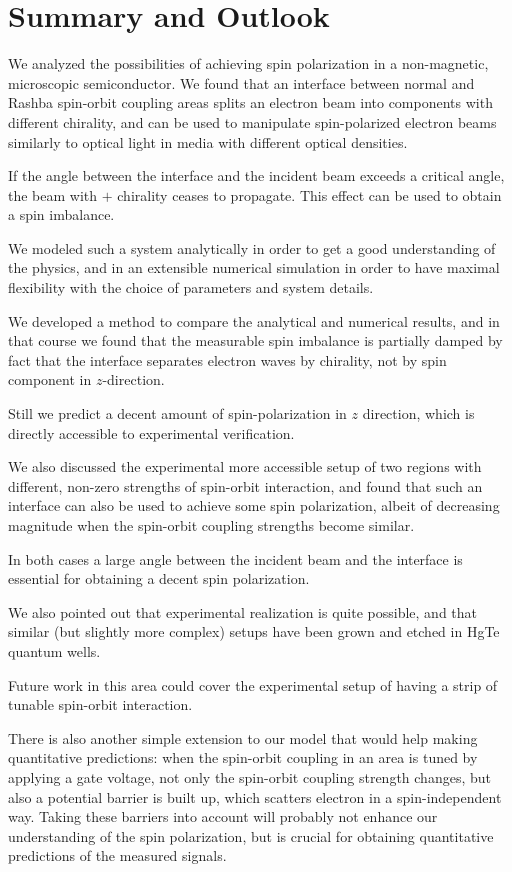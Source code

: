 \chapter{Summary and Outlook}
\label{sec:summary}

We analyzed the possibilities of achieving spin polarization in a
non-magnetic, microscopic semiconductor. We found that an interface between
normal and Rashba spin-orbit coupling areas splits an electron beam into
components with different chirality, and can be used to manipulate
spin-polarized electron beams similarly to optical light in media with
different optical densities.

           
If the angle between the interface
and the incident beam exceeds a critical angle, the beam with $+$ chirality
ceases to propagate. This effect can be used to obtain a spin imbalance.

We modeled such a system analytically in order to get a good understanding
of the physics, and in an extensible numerical simulation in order to have
maximal flexibility with the choice of parameters and system details.

We developed a method to compare the analytical and numerical results, and in
that course we found that the measurable spin imbalance is partially
damped by fact that the interface separates electron waves by chirality,
not by spin component in $z$-direction.

Still we predict a decent amount of spin-polarization in $z$ direction, which
is directly accessible to experimental verification.

We also discussed the experimental more accessible setup of two regions with
different, non-zero strengths of spin-orbit interaction, and found that such an
interface can also be used to achieve some spin polarization, albeit
of decreasing magnitude when the spin-orbit coupling strengths become similar. 

In both cases a large angle between the incident beam and the interface is
essential for obtaining a decent spin polarization.

We also pointed out that experimental realization is quite possible, and that
similar (but slightly more complex) setups have been grown and etched in HgTe
quantum wells.

Future work in this area could cover the experimental setup of having a strip
of tunable spin-orbit interaction.

There is also another simple extension to our model that would help making
quantitative predictions: when the spin-orbit coupling in an area is tuned by
applying a gate voltage, not only the spin-orbit coupling strength changes,
but also a potential barrier is built up, which scatters electron in a
spin-independent way. Taking these barriers into account will probably not
enhance our understanding of the spin polarization, but is crucial for
obtaining quantitative predictions of the measured signals.

